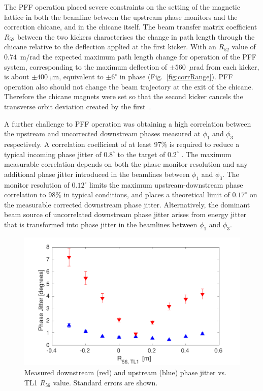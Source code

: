 \documentclass[%
 reprint,
 superscriptaddress,
 amsmath,
 amssymb,
 prl,
]{revtex4-1}
\begin{document}
The PFF operation placed severe constraints on the setting of the 
magnetic lattice in both the beamline between the upstream phase monitors and 
the correction chicane, and in  the chicane itself.
The beam transfer matrix coefficient \(R_{52}\) between the two kickers 
characterises the change in path length through the chicane relative to the 
deflection applied at the first kicker. 
With an \(R_{52}\) value of \(0.74\)~m/rad \cite{RobertsThesis} the expected 
maximum path length change for operation of the PFF system, corresponding to 
the maximum deflection of \(\pm560\)~\(\mu\)rad from each kicker, is about 
\(\pm400~\mathrm{\mu m}\), equivalent to \(\pm6^\circ\) in phase 
(Fig.~\ref{fig:corrRange}). PFF operation also should not change the beam 
trajectory at the exit of the chicane. Therefore the chicane magnets were set 
so that the second kicker cancels the transverse orbit deviation created by the 
first~\cite{RobertsThesis}.

A further challenge to PFF operation was obtaining a high correlation 
between the upstream and uncorrected downstream phases measured at \(\phi_1\) 
and \(\phi_3\) respectively. 
A correlation coefficient of at least 97\% is required to reduce a typical 
incoming phase jitter of \(0.8^\circ\) to the target of \(0.2^\circ\) 
\cite{RobertsThesis}. 
The maximum measurable correlation depends on both the phase monitor resolution 
and any additional phase jitter introduced in the beamlines between \(\phi_1\) 
and \(\phi_3\). The monitor resolution of \(0.12^\circ\) limits the maximum 
upstream-downstream phase correlation to \(98\%\) in typical conditions, and 
places a theoretical limit of \(0.17^\circ\) on the measurable corrected 
downstream phase jitter. 
Alternatively, the dominant beam source of uncorrelated downstream phase jitter 
arises from energy jitter that is transformed into phase jitter in the 
beamlines between \(\phi_1\) and \(\phi_3\). 

\begin{figure}
	\includegraphics[width=\columnwidth]{figs/r56Scan}
	\caption{\label{fig:r56Scan}Measured downstream (red) and upstream (blue) 
	phase jitter vs. TL1 \(R_{56}\) value. Standard errors are shown.
		}
\end{figure}
\end{document}
